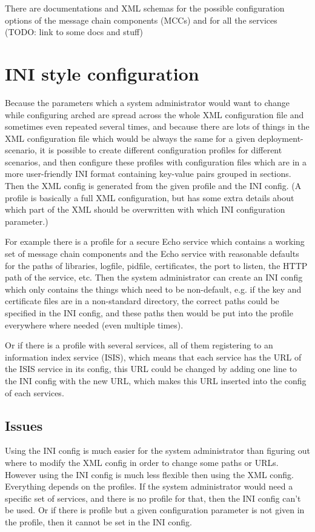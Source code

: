 \documentclass{article}
\begin{document}
There are documentations and XML schemas for the possible configuration options of the message chain components (MCCs) and for all the services (TODO: link to some docs and stuff)



\section{INI style configuration}

Because the parameters which a system administrator would want to change while configuring arched are spread across the whole XML configuration file and sometimes even repeated several times, and because there are lots of things in the XML configuration file which would be always the same for a given deployment-scenario, it is possible to create different configuration profiles for different scenarios, and then configure these profiles with configuration files which are in a more user-friendly INI format containing key-value pairs grouped in sections. Then the XML config is generated from the given profile and the INI config. (A profile is basically a full XML configuration, but has some extra details about which part of the XML should be overwritten with which INI configuration parameter.)

For example there is a profile for a secure Echo service which contains a working set of message chain components and the Echo service with reasonable defaults for the paths of libraries, logfile, pidfile, certificates, the port to listen, the HTTP path of the service, etc. Then the system administrator can create an INI config which only contains the things which need to be non-default, e.g. if the key and certificate files are in a non-standard directory, the correct paths could be specified in the INI config, and these paths then would be put into the profile everywhere where needed (even multiple times).

Or if there is a profile with several services, all of them registering to an information index service (ISIS), which means that each service has the URL of the ISIS service in its config, this URL could be changed by adding one line to the INI config with the new URL, which makes this URL inserted into the config of each services.

\subsection{Issues}

Using the INI config is much easier for the system administrator than figuring out where to modify the XML config in order to change some paths or URLs. However using the INI config is much less flexible then using the XML config. Everything depends on the profiles. If the system administrator would need a specific set of services, and there is no profile for that, then the INI config can't be used. Or if there is profile but a given configuration parameter is not given in the profile, then it cannot be set in the INI config.
\end{document}
